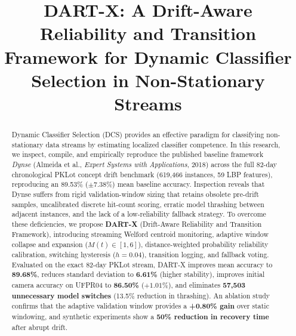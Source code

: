 \documentclass[conference,10pt]{IEEEtran}
\begin{document}
\title{DART-X: A Drift-Aware Reliability and Transition Framework for Dynamic Classifier Selection in Non-Stationary Streams}

\author{
    \and
}

\maketitle

\begin{abstract}
Dynamic Classifier Selection (DCS) provides an effective paradigm for classifying non-stationary data streams by estimating localized classifier competence. In this research, we inspect, compile, and empirically reproduce the published baseline framework \textit{Dynse} (Almeida et al., \textit{Expert Systems with Applications}, 2018) across the full 82-day chronological PKLot concept drift benchmark (619,466 instances, 59 LBP features), reproducing an 89.53\% ($\pm 7.38\%$) mean baseline accuracy. Inspection reveals that Dynse suffers from rigid validation-window sizing that retains obsolete pre-drift samples, uncalibrated discrete hit-count scoring, erratic model thrashing between adjacent instances, and the lack of a low-reliability fallback strategy. To overcome these deficiencies, we propose \textbf{DART-X} (Drift-Aware Reliability and Transition Framework), introducing streaming Welford centroid monitoring, adaptive window collapse and expansion ($M(t) \in [1, 6]$), distance-weighted probability reliability calibration, switching hysteresis ($h = 0.04$), transition logging, and fallback voting. Evaluated on the exact 82-day PKLot stream, DART-X improves mean accuracy to \textbf{89.68\%}, reduces standard deviation to \textbf{6.61\%} (higher stability), improves initial camera accuracy on UFPR04 to \textbf{86.50\%} ($+1.01\%$), and eliminates \textbf{57,503 unnecessary model switches} (13.5\% reduction in thrashing). An ablation study confirms that the adaptive validation window provides a \textbf{+0.80\% gain} over static windowing, and synthetic experiments show a \textbf{50\% reduction in recovery time} after abrupt drift.
\end{abstract}
\end{document}

